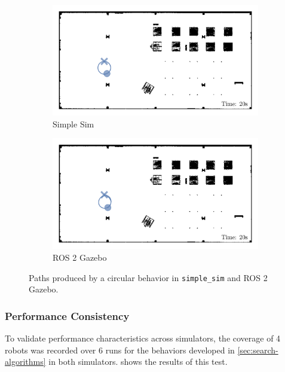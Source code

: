 \begin{figure}[H]
  \centering
  \begin{subfigure}[b]{0.45\textwidth}
    \centering
    \includegraphics[width=\textwidth]{./figures/plots/consistency/simple-sim-paths-(after-20s).png}
    \caption{Simple Sim}
  \end{subfigure}
  \begin{subfigure}[b]{0.45\textwidth}
    \centering
    \includegraphics[width=\textwidth]{./figures/plots/consistency/ros-2-paths-(after-20s).png}
    \caption{ROS 2 Gazebo}
  \end{subfigure}
  \caption{Paths produced by a circular behavior in \texttt{simple\_sim} and ROS 2 Gazebo.}
  \label{fig:movement-consistency}
\end{figure}

\subsubsection{Performance Consistency}
To validate performance characteristics across simulators, the coverage of 4 robots was recorded over 6 runs for the behaviors developed in \cref{sec:search-algorithms} in both simulators.  shows the results of this test.

